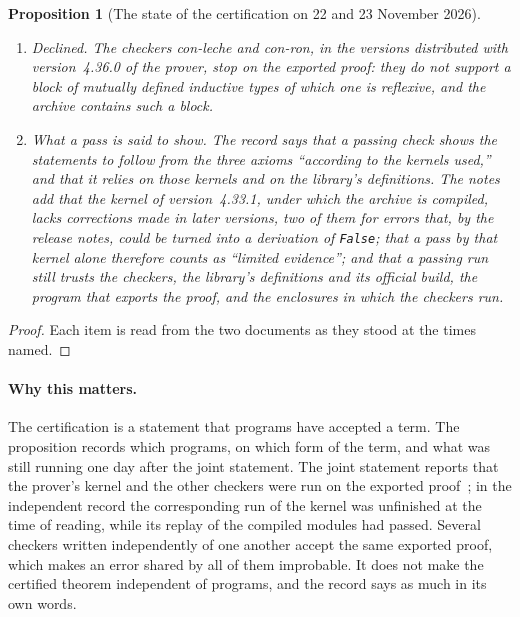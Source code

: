 \documentclass[11pt]{article}
\newtheorem{proposition}[theorem]{Proposition}
\theoremstyle{definition}
\theoremstyle{remark}
\DeclareRobustCommand{\lean}[1]{{\renewcommand{\_}{\textunderscore\allowbreak}\texttt{#1}}}
\newcommand{\False}{\lean{False}}
\begin{document}
\begin{proposition}[The state of the certification on 22 and 23 November 2026]
\begin{enumerate}[leftmargin=2em,itemsep=1pt]
\item \emph{Declined.} The checkers con-leche and con-ron, in the versions distributed with version~4.36.0 of the prover, stop on the exported proof: they do not support a block of mutually defined inductive types of which one is reflexive, and the archive contains such a block.
\item \emph{What a pass is said to show.} The record says that a passing check shows the statements to follow from the three axioms ``according to the kernels used,'' and that it relies on those kernels and on the library's definitions. The notes add that the kernel of version~4.33.1, under which the archive is compiled, lacks corrections made in later versions, two of them for errors that, by the release notes, could be turned into a derivation of \False; that a pass by that kernel alone therefore counts as ``limited evidence''; and that a passing run still trusts the checkers, the library's definitions and its official build, the program that exports the proof, and the enclosures in which the checkers run.
\end{enumerate}
\end{proposition}

\begin{proof}
Each item is read from the two documents as they stood at the times named.
\end{proof}

\paragraph{Why this matters.} The certification is a statement that programs have accepted a term. The proposition records which programs, on which form of the term, and what was still running one day after the joint statement. The joint statement reports that the prover's kernel and the other checkers were run on the exported proof~\citep{leanblog}; in the independent record the corresponding run of the kernel was unfinished at the time of reading, while its replay of the compiled modules had passed. Several checkers written independently of one another accept the same exported proof, which makes an error shared by all of them improbable. It does not make the certified theorem independent of programs, and the record says as much in its own words.
\end{document}
